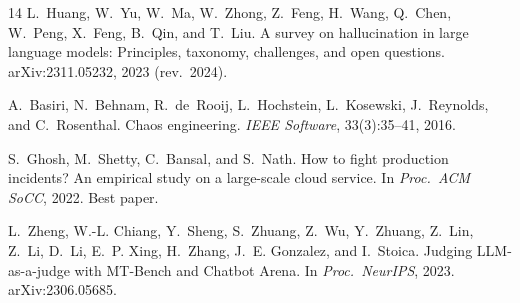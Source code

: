 \documentclass[11pt]{article}
\begin{document}
\begin{thebibliography}{14}
L.~Huang, W.~Yu, W.~Ma, W.~Zhong, Z.~Feng, H.~Wang, Q.~Chen, W.~Peng,
  X.~Feng, B.~Qin, and T.~Liu.
\newblock A survey on hallucination in large language models: Principles,
  taxonomy, challenges, and open questions.
\newblock arXiv:2311.05232, 2023 (rev.\ 2024).

A.~Basiri, N.~Behnam, R.~de~Rooij, L.~Hochstein, L.~Kosewski,
  J.~Reynolds, and C.~Rosenthal.
\newblock Chaos engineering.
\newblock \emph{IEEE Software}, 33(3):35--41, 2016.

S.~Ghosh, M.~Shetty, C.~Bansal, and S.~Nath.
\newblock How to fight production incidents? {An} empirical study on a
  large-scale cloud service.
\newblock In \emph{Proc.\ ACM SoCC}, 2022. Best paper.

L.~Zheng, W.-L. Chiang, Y.~Sheng, S.~Zhuang, Z.~Wu, Y.~Zhuang, Z.~Lin,
  Z.~Li, D.~Li, E.~P. Xing, H.~Zhang, J.~E. Gonzalez, and I.~Stoica.
\newblock Judging {LLM}-as-a-judge with {MT-Bench} and {Chatbot Arena}.
\newblock In \emph{Proc.\ NeurIPS}, 2023. arXiv:2306.05685.

\end{thebibliography}
\end{document}
